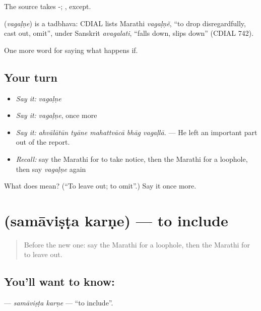 The source takes -; , except.

\begin{cousinweb}
\textbf{} (\emph{vagaḷṇe}) is a tadbhava: CDIAL lists Marathi \emph{vagaḷṇẽ}, \textquotedblleft{}to drop disregardfully, cast out, omit\textquotedblright{}, under Sanskrit \emph{avagalati}, \textquotedblleft{}falls down, slips down\textquotedblright{} (CDIAL 742).
\end{cousinweb}

\begin{grammarlens}[title={What you've built}]
One more word for saying what happens if.
\end{grammarlens}

\subsection*{Your turn}
\begin{itemize}
\raggedright
  \item \emph{Say it:} \emph{vagaḷṇe}
  \item \emph{Say it:} \emph{vagaḷṇe}, once more
  \item \emph{Say it:} \emph{ahvālātūn tyāne mahattvācā bhāg vagaḷlā.} — He left an important part out of the report.
  \item \emph{Recall:} say the Marathi for to take notice, then the Marathi for a loophole, then say \emph{vagaḷṇe} again
\end{itemize}

\begin{tcolorbox}[breakable,colback=teal!4,colframe=teal!35!black,title={Before you move on}]
What does  mean? (\textquotedblleft{}To leave out; to omit\textquotedblright{}.) Say it once more.
\end{tcolorbox}
\section[\texorpdfstring{\mr{समाविष्ट} \mr{करणे} (samāviṣṭa karṇe)}{समाविष्ट करणे (samāviṣṭa karṇe)}]{  (samāviṣṭa karṇe) — to include}

\label{lesson:MR-C387-samavista-karne}



\begin{quote}
Before the new one: say the Marathi for a loophole, then the Marathi for to leave out.
\end{quote}

\subsection*{You'll want to know:  }
\textbf{ } — \emph{samāviṣṭa karṇe} — \textquotedblleft{}to include\textquotedblright{}.


